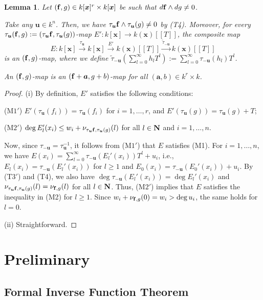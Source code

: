 \documentclass{amsart}
\theoremstyle{plain}
\newtheorem{lem}[thm]{Lemma}
\theoremstyle{definition}
\newcommand{\nd}{\noindent}
\newcommand{\N}{{\bf N}}
\newcommand{\x}{{\boldsymbol x}}
\newcommand{\ba}{{\boldsymbol a}}
\newcommand{\bu}{{\boldsymbol u}}
\newcommand{\ff}{{\bf f}}
\newcommand{\kx}{k[\x]}
\newcommand{\kxr}{k(\x)}
\newcommand{\degw  }{\deg}
\begin{document}
\begin{lem}\label{lem:(f,g)-map reduction}
Let $(\ff ,g)\in \kx ^r\times \kx $ 
be such that $d\ff \wedge dg\ne 0$. 


\nd{\rm (i)} 
Take any $\bu \in k^n$. 
Then, 
we have $\tau _{\bu }\ff \wedge \tau _{\bu }(g)\ne 0$ 
by {\rm (T4)}. 
Moreover, 
for every $\tau _{\bu }(\ff ,g):=(\tau _{\bu }\ff ,\tau _{\bu }(g))$-map 
$E':\kx \to \kxr [[T]]$, 
the composite map 
$$
E:\kx \stackrel{\tau _{\bu }}{\longrightarrow }
\kx \stackrel{E'}{\longrightarrow }
\kxr [[T]]
\stackrel{\tilde{\tau }_{-\bu }}{\longrightarrow }
\kxr [[T]]
$$
is an $(\ff ,g)$-map, 
where we define 
$\tilde{\tau }_{-\bu }(\sum _{l=0}^\infty h_lT^l):=
\sum _{l=0}^\infty \tau _{-\bu }(h_l)T^l$. 


\nd{\rm (ii)} 
An $(\ff ,g)$-map is an $(\ff +\ba ,g+b)$-map 
for all $(\ba ,b)\in k^r\times k$. 

\end{lem}
\begin{proof}
(i) By definition, 
$E'$ satisfies the following conditions: 


\nd (M$1'$) $E'(\tau _{\bu }(f_i))=\tau _{\bu }(f_i)$ for $i=1,\ldots ,r$, 
and $E'(\tau _{\bu }(g))=\tau _{\bu }(g)+T$; 


\nd (M$2'$) 
$\degw E_l'(x_i)\le w_i+\nu _{\tau _{\bu }\ff ,\tau _{\bu }(g)}(l)$ 
for all $l\in \N $ and $i=1,\ldots ,n$. 

\nd 
Now, since $\tau _{-\bu }=\tau _{\bu }^{-1}$, 
it follows from (M$1'$) that $E$ satisfies (M1). 
For $i=1,\ldots ,n$, 
we have $E(x_i)=\sum _{l=0}^\infty 
\tau _{-\bu }(E_l'(x_i))T^l+u_i$, 
i.e., 
$E_l(x_i)=\tau _{-\bu }(E_l'(x_i))$ for $l\ge 1$ 
and $E_0(x_i)=\tau _{-\bu }(E_0'(x_i))+u_i$. 
By (T3$'$) and (T4), we also have 
$\deg \tau _{-\bu }(E_l'(x_i))=\deg E_l'(x_i)$ and 
$\nu _{\tau _{\bu }\ff ,\tau _{\bu }(g)}(l)=\nu _{\ff ,g}(l)$ 
for all $l\in \N $. 
Thus, 
(M$2'$) implies that 
$E$ satisfies the inequality in (M2) for $l\ge 1$. 
Since $w_i+\nu _{\ff ,g}(0)=w_i>\deg u_i$, 
the same holds for $l=0$. 


(ii) Straightforward. 
\end{proof}



\section{Preliminary}\label{sect:preliminary}
\setcounter{equation}{0}


\subsection{Formal Inverse Function Theorem}\label{sect:FIFT}
\end{document}
